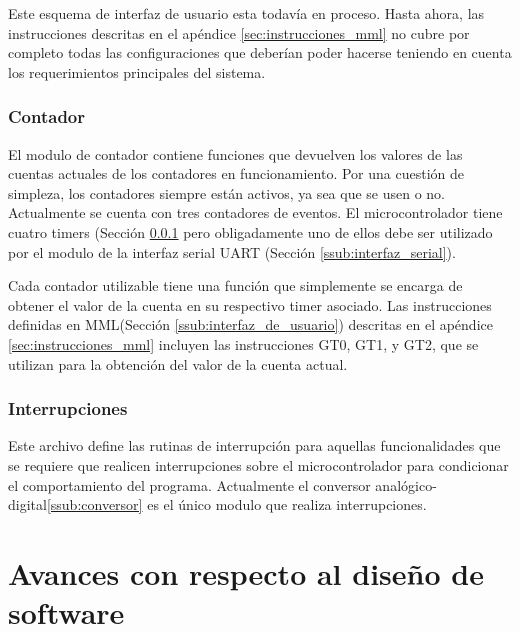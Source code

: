 \documentclass{article}
\theoremstyle{definition}
\theoremstyle{remark}
\begin{document}
Este esquema de interfaz de usuario esta todavía en proceso. Hasta ahora, las instrucciones descritas en el apéndice \ref{sec:instrucciones_mml} no cubre por completo todas las configuraciones que deberían poder hacerse teniendo en cuenta los requerimientos principales del sistema.


\subsubsection{Contador} %
\label{ssub:contador}

El modulo de contador contiene funciones que devuelven los valores de las cuentas actuales de los contadores en funcionamiento. Por una cuestión de simpleza, los contadores siempre están activos, ya sea que se usen o no. Actualmente se cuenta con tres contadores de eventos. El microcontrolador tiene cuatro timers (Sección \ref{ssub:contador} pero obligadamente uno de ellos debe ser utilizado por el modulo de la interfaz serial UART (Sección \ref{ssub:interfaz_serial}).

Cada contador utilizable tiene una función que simplemente se encarga de obtener el valor de la cuenta en su respectivo timer asociado. Las instrucciones definidas en MML(Sección \ref{ssub:interfaz_de_usuario}) descritas en el apéndice \ref{sec:instrucciones_mml} incluyen las instrucciones GT0, GT1, y GT2, que se utilizan para la obtención del valor de la cuenta actual.



\subsubsection{Interrupciones} %
\label{ssub:interrupciones}

Este archivo define las rutinas de interrupción para aquellas funcionalidades que se requiere que realicen interrupciones sobre el microcontrolador para condicionar el comportamiento del programa. Actualmente el conversor analógico-digital\ref{ssub:conversor} es el único modulo que realiza interrupciones.




\section{Avances con respecto al diseño de software} %
\label{sec:avances_con_respecto_al_diseno_de_software}
\end{document}
